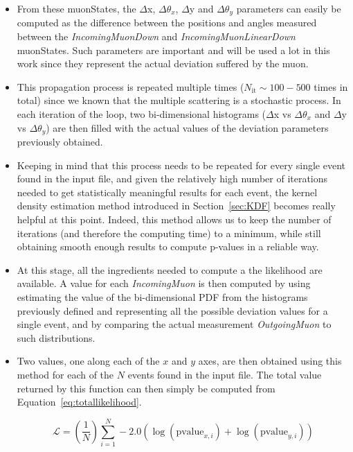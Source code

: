 \documentclass[a4paper, 11pt]{report}
\begin{document}
\begin{itemize}
\item From these muonStates, the $\Delta$x, $\Delta \theta_x$, $\Delta$y and $\Delta \theta_y$ parameters can easily be computed as the difference between the positions and angles measured between the \textit{IncomingMuonDown} and \textit{IncomingMuonLinearDown} muonStates. Such parameters are important and will be used a lot in this work since they represent the actual deviation suffered by the muon.
\item This propagation process is repeated multiple times ($N_{\text{it}} \sim 100-500$ times in total) since we known that the multiple scattering is a stochastic process. In each iteration of the loop, two bi-dimensional histograms ($\Delta$x vs $\Delta \theta_x$ and $\Delta$y vs $\Delta \theta_y$) are then filled with the actual values of the deviation parameters previously obtained.
\item Keeping in mind that this process needs to be repeated for every single event found in the input file, and given the relatively high number of iterations needed to get statistically meaningful results for each event, the kernel density estimation method introduced in Section~\ref{sec:KDF} becomes really helpful at this point. Indeed, this method allows us to keep the number of iterations (and therefore the computing time) to a minimum, while still obtaining smooth enough results to compute p-values in a reliable way.
\item At this stage, all the ingredients needed to compute a the likelihood are available. A value for each \textit{IncomingMuon} is then computed by using estimating the value of the bi-dimensional PDF from the histograms previously defined and representing all the possible deviation values for a single event, and by comparing the actual measurement \textit{OutgoingMuon} to such distributions.
\item Two values, one along each of the $x$ and $y$ axes, are then obtained using this method for each of the $N$ events found in the input file. The total value returned by this function can then simply be computed from Equation~\ref{eq:totallikelihood}.

\begin{equation}
\label{eq:totallikelihood}
\mathcal{L} = \left( \frac{1}{N} \right) \sum_{i = 1}^N -2.0 \left ( \log(\text{pvalue}_{x, i}) + \log(\text{pvalue}_{y, i}) \right)
\end{equation}



\end{itemize}
\end{document}
